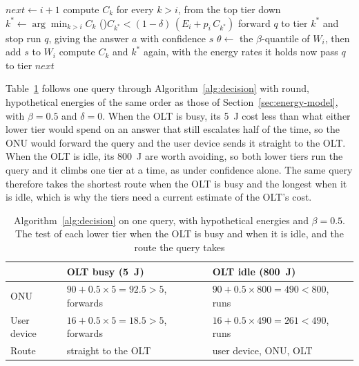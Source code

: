 \documentclass[cic,dipl,english]{infufrgs}
\begin{document}
\begin{algorithm}[htb]
  \caption{The decision of tier $i < J$ on a query $q$}
  \label{alg:decision}
  $\mathit{next} \leftarrow i+1$\;
  compute $C_k$ for every $k > i$, from the top tier
  down
  $k^* \leftarrow \arg\min_{k>i} C_k$\;
  \If(){$C_{k^*} < (1-\delta)\,(E_i + p_i\,C_{k^*})$}{
    forward $q$ to tier $k^*$ and stop\;
  }
  run $q$, giving the answer $a$ with confidence $s$\;
  $\theta \leftarrow$ the $\beta$-quantile of $W_i$, then add $s$ to $W_i$\;
  compute $C_k$ and $k^*$ again, with the energy rates it holds now\;
  pass $q$ to tier $\mathit{next}$\;
\end{algorithm}

Table~\ref{tab:example} follows one query through Algorithm~\ref{alg:decision} with
round, hypothetical energies of the same order as those of
Section~\ref{sec:energy-model}, with $\beta = 0.5$ and $\delta = 0$. When the OLT is
busy, its 5~J cost less than what either lower tier would spend on an answer that still
escalates half of the time, so the ONU would forward the query and the user device sends
it straight to the OLT. When the OLT is idle, its 800~J are worth avoiding, so both lower
tiers run the query and it climbs one tier at a time, as under confidence alone. The same
query therefore takes the shortest route when the OLT is busy and the longest when it is
idle, which is why the tiers need a current estimate of the OLT's cost.

\begin{table}[htb]
  \centering
  \caption[Algorithm~\ref{alg:decision} on one query, with hypothetical energies and $\beta = 0.5$]{Algorithm~\ref{alg:decision} on one query, with hypothetical energies and $\beta = 0.5$.
  The test of each lower tier when the OLT is busy and when it is idle, and the route the query takes}
  \label{tab:example}
  \begin{tabular}{lll}
    \toprule
    & OLT busy (5~J) & OLT idle (800~J) \\
    \midrule
    ONU & $90 + 0.5 \times 5 = 92.5 > 5$, forwards & $90 + 0.5 \times 800 = 490 < 800$, runs \\
    User device & $16 + 0.5 \times 5 = 18.5 > 5$, forwards & $16 + 0.5 \times 490 = 261 < 490$, runs \\
    Route & straight to the OLT & user device, ONU, OLT \\
    \bottomrule
  \end{tabular}
\end{table}
\end{document}
